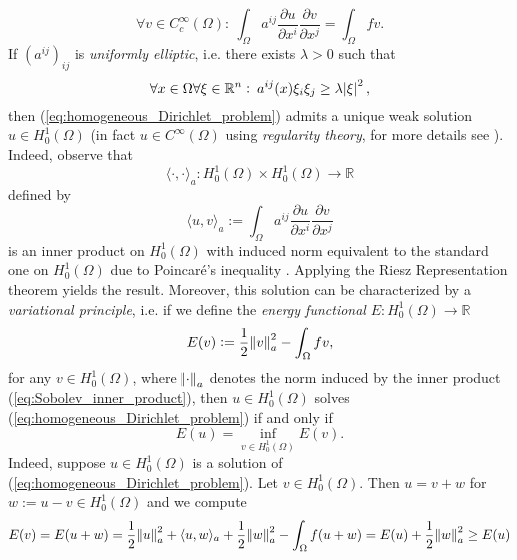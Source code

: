 \begin{equation*}
	\forall v \in C^\infty_c(\Omega): \> \int_\Omega a^{ij} \frac{\partial u}{\partial x^i}\frac{\partial v}{\partial x^j} = \int_\Omega fv.
\end{equation*}
If $(a^{ij})_{ij}$ is \emph{uniformly elliptic}, i.e. there exists $\lambda > 0$ such that
\begin{equation*}
	\forall x \in \Omega\forall \xi \in \mathbb{R}^n : \> a^{ij}(x)\xi_i\xi_j \geq \lambda \abs{\xi}^2,	
\end{equation*}
\noindent then (\ref{eq:homogeneous_Dirichlet_problem}) admits a unique weak solution $u \in H^1_0(\Omega)$ (in fact $u \in C^\infty(\Omega)$ using \emph{regularity theory}, for more details see \cite[175]{struwe:fa:2014}). Indeed, observe that 
\begin{equation*}
	\langle \cdot,\cdot \rangle_a : H^1_0(\Omega) \times H^1_0(\Omega) \to \mathbb{R}
\end{equation*}
\noindent defined by
\begin{equation}
	\label{eq:Sobolev_inner_product}
	\langle u, v \rangle_a := \int_\Omega a^{ij} \frac{\partial u}{\partial x^i}\frac{\partial v}{\partial x^j}
\end{equation}
\noindent is an inner product on $H^1_0(\Omega)$ with induced norm equivalent to the standard one on $H^1_0(\Omega)$ due to Poincar\'e's inequality \cite[107]{struwe:fa:2014}. Applying the Riesz Representation theorem \cite[49--50]{struwe:fa:2014} yields the result. Moreover, this solution can be characterized by a \emph{variational principle}, i.e. if we define the \emph{energy functional} $E : H^1_0(\Omega) \to \mathbb{R}$
\begin{equation*}
	E(v) := \frac{1}{2} \norm{v}^2_a - \int_\Omega fv,
\end{equation*}
\noindent for any $v \in H^1_0(\Omega)$, where $\norm{\cdot}_a$ denotes the norm induced by the inner product (\ref{eq:Sobolev_inner_product}), then $u \in H^1_0(\Omega)$ solves (\ref{eq:homogeneous_Dirichlet_problem}) if and only if
\begin{equation}
	\label{eq:variational_formulation}
	E(u) = \inf_{v \in H^1_0(\Omega)}E(v).
\end{equation}
Indeed, suppose $u \in H^1_0(\Omega)$ is a solution of (\ref{eq:homogeneous_Dirichlet_problem}). Let $v \in H^1_0(\Omega)$. Then $u = v + w$ for $w := u - v \in H^1_0(\Omega)$ and we compute
\begin{equation*}
	E(v) = E(u + w) = \frac{1}{2}\norm{u}^2_a + \langle u,w \rangle_a + \frac{1}{2}\norm{w}^2_a - \int_\Omega f(u + w) = E(u) + \frac{1}{2}\norm{w}^2_a \geq E(u)
\end{equation*}
